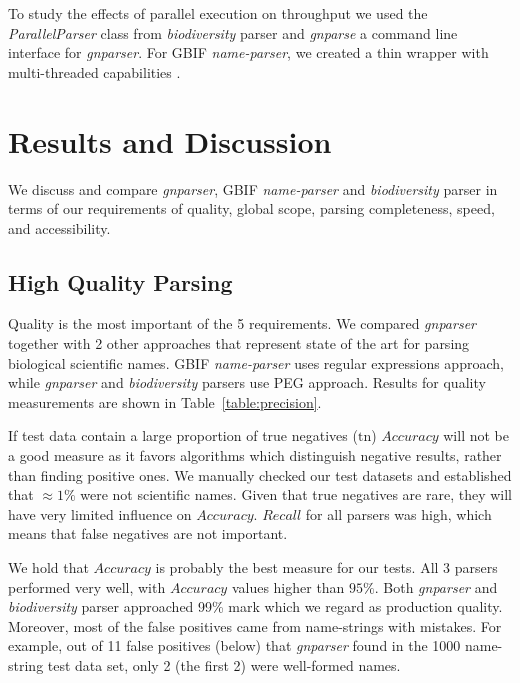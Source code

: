 \documentclass{bmcart}
\begin{document}
To study the effects of parallel execution on throughput we used the
\textit{ParallelParser} class from \textit{biodiversity} parser and
\textit{gnparse} a command line interface for \textit{gnparser}. For GBIF
\textit{name-parser}, we created a thin wrapper with multi-threaded
capabilities \cite{gbifparser}.

\section*{Results and Discussion}

We discuss and compare \textit{gnparser}, GBIF \textit{name-parser} and
\textit{biodiversity} parser in terms of our requirements of
quality, global scope, parsing completeness, speed, and accessibility. 


\subsection*{High Quality Parsing}

Quality is the most important  of the 5 requirements.  We
compared \textit{gnparser} together with 2 other approaches  that
represent state of the art for parsing biological scientific names. GBIF
\textit{name-parser} uses regular expressions approach, while \textit{gnparser}
and \textit{biodiversity} parsers use PEG approach.  Results for quality
measurements are shown in Table~\ref{table:precision}.

If test data contain a large proportion of true negatives ($\text{tn}$)
$Accuracy$ will not be a good measure as it favors algorithms which distinguish
negative results, rather than finding positive ones. We manually checked our test datasets and established that  $\approx1\%$ were not scientific names. Given that true negatives are rare, they will have very limited influence on $Accuracy$. $Recall$ for all parsers was high, which means that false negatives are not important. 

We hold that $Accuracy$ is probably the best measure
for our tests. All 3 parsers performed very well, with $Accuracy$
values higher than $95\%$. Both \textit{gnparser} and \textit{biodiversity}
parser approached 99\% mark which we regard as production quality. Moreover,
most of the false positives came from name-strings with mistakes. For example, out of 11 false positives (below) that \textit{gnparser} found in the 1000
name-string test data set, only 2 (the first 2) were well-formed names. 
\end{document}
